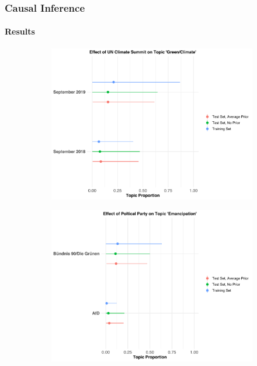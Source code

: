 \documentclass[xcolor=dvipsnames]{beamer}
\begin{document}
\begin{frame}
\frametitle{Causal Inference}
\framesubtitle{Results}
\begin{figure}[h!]
  \centering
  \captionsetup{justification=centering}
  \begin{subfigure}[b]{0.49\linewidth}
    \includegraphics[width=\linewidth]{../../plots/presentation/climate_summit_props.pdf}
  \end{subfigure}
  \begin{subfigure}[b]{0.49\linewidth}
    \includegraphics[width=\linewidth]{../../plots/presentation/emancipation_props.pdf}
  \end{subfigure}
\end{figure}
\end{frame}
\end{document}
